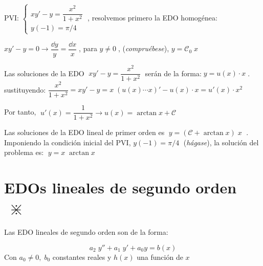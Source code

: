 \begin{ejem}

PVI: $\begin{cases} xy'-y=\dfrac {x^2}{1+x^2} \\ y(-1)=\pi/4 \end{cases}\; $, resolvemos primero la EDO homogénea:

$xy'-y=0 \to \dfrac{\dd y}{y}= \dfrac {\dd x }{x}\; $, para $y\neq 0\; $, (\emph{compruébese}), $y=\mathcal{C}_0\; x$ 

Las soluciones de la EDO $\; xy'-y=\dfrac {x^2}{1+x^2} \; $ serán de la forma:$\; y= u(x) \cdot  x \; $. sustituyendo:
$\dfrac {x^2}{1+x^2}= xy'-y=x\; \left( u(x) \cdots x \right)' - u(x) \cdot x =u'(x) \cdot x^2$

Por tanto, $\; u'(x)=\dfrac {1}{1+x^2}  \to u(x)=\arctan x + \mathcal C$

Las soluciones de la EDO lineal de primer orden es $\; y=\left( \mathcal C + \arctan x \right)\; x\; $ . Imponiendo la condición inicial del PVI, $y(-1)=\pi/4\; $ (\emph{hágase}), la solución del problema es: $\;y=x\; \arctan x \; $

\end{ejem}



\section{EDOs lineales de segundo orden $\;\divideontimes$}

\begin{defi}
Las EDO lineales de segundo orden son de la forma:

\begin{equation*}
  \boxed{ \; a_2\; y'' + a_1	\; y' + a_0 y= b(x) \; }
\end{equation*}
	Con $a_0\neq 0, \; b_0$ constantes reales y $h(x)$ una función de $x$
\end{defi}

